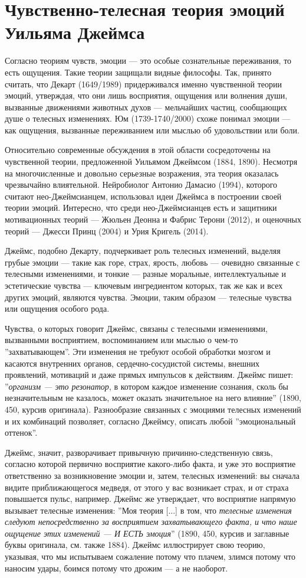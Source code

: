 \documentclass[11pt]{book}
\begin{document}
\section{Чувственно-телесная теория эмоций Уильяма Джеймса}

Согласно теориям чувств, эмоции --- это особые сознательные переживания, то есть ощущения. Такие теории защищали видные философы. Так, принято считать, что Декарт (1649/1989) придерживался именно чувственной теории эмоций, утверждая, что они лишь восприятия, ощущения или волнения души, вызванные движениями животных духов --- мельчайших частиц, сообщающих душе о телесных изменениях. Юм (1739-1740/2000) схоже понимал эмоции --- как ощущения, вызванные переживанием или мыслью об удовольствии или боли.

Относительно современные обсуждения в этой области сосредоточены на чувственной теории, предложенной Уильямом Джеймсом (1884, 1890). Несмотря на многочисленные и довольно серьезные возражения, эта теория оказалась чрезвычайно влиятельной. Нейробиолог Антонио Дамасио (1994), которого считают нео-Джеймсианцем, использовал идеи Джеймса в построении своей теории эмоций. Интересно, что среди нео-Джеймсианцев есть и защитники мотивационных теорий --- Жюльен Деонна и Фабрис Терони (2012), и оценочных теорий --- Джесси Принц (2004) и Урия Кригель (2014).

Джеймс, подобно Декарту, подчеркивает роль телесных изменений, выделяя грубые эмоции --- такие как горе, страх, ярость, любовь --- очевидно связанные с телесными изменениями, и тонкие --- разные моральные, интеллектуальные и эстетические чувства --- ключевым ингредиентом которых, так же как и всех других эмоций, являются чувства. Эмоции, таким образом --- телесные чувства или ощущения особого рода.

Чувства, о которых говорит Джеймс, связаны с телесными изменениями, вызванными восприятием, воспоминанием или мыслью о чем-то ''захватывающем''. Эти изменения не требуют особой обработки мозгом и касаются внутренних органов, сердечно-сосудистой системы, внешних проявлений, мотиваций и даже прямых импульсов к действиям. Джеймс пишет: ''\textit{организм --- это резонатор}, в котором каждое изменение сознания, сколь бы незначительным не казалось, может оказать значительное на него влияние'' (1890, 450, курсив оригинала). Разнообразие связанных с эмоциями телесных изменений и их комбинаций позволяет, согласно Джеймсу, описать любой ''эмоциональный оттенок''.

Джеймс, значит, разворачивает привычную причинно-следственную связь, согласно которой первично восприятие какого-либо факта, и уже это восприятие ответственно за возникновение эмоции и, затем, телесных изменений: вы сначала видите приближающегося медведя, от этого у вас возникает страх, и от страха повышается пульс, например. Джеймс же утверждает, что восприятие напрямую вызывает телесные изменения: ''Моя теория [...] в том, что \textit{телесные изменения следуют непосредственно за восприятием захватывающего факта, и что наше ощущение этих изменений --- И ЕСТЬ эмоция}'' (1890, 450, курсив и заглавные буквы оригинала, см. также 1884). Джеймс иллюстрирует свою теорию, указывая, что мы испытываем сожаление потому что плачем, злимся потому что наносим удары, боимся потому что дрожим --- а не наоборот.
\end{document}
